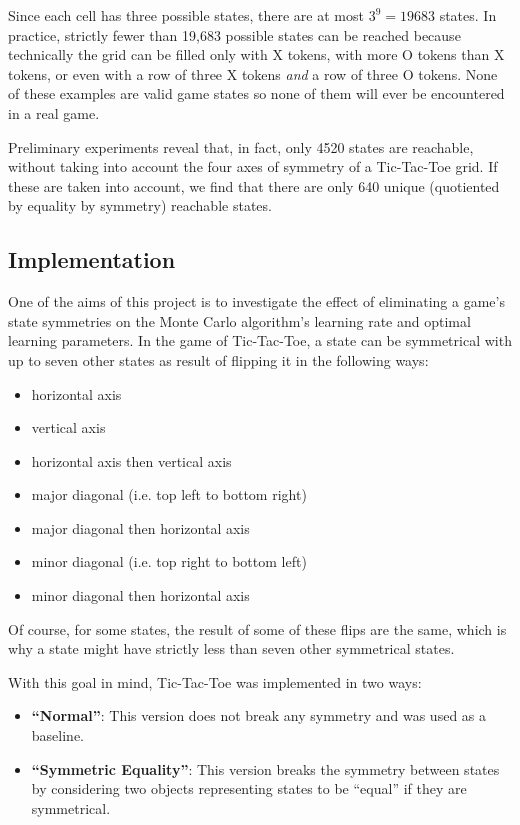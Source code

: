 \documentclass[11pt,a4paper]{report}
\begin{document}
Since each cell has three possible states, there are at most $3^9 = 19683$ states. In practice, strictly fewer than 19,683 possible states can be reached because technically the grid can be filled only with X tokens, with more O tokens than X tokens, or even with a row of three X tokens \emph{and} a row of three O tokens. None of these examples are valid game states so none of them will ever be encountered in a real game.

Preliminary experiments reveal that, in fact, only 4520 states are reachable, without taking into account the four axes of symmetry of a Tic-Tac-Toe grid. If these are taken into account, we find that there are only 640 unique (quotiented by equality by symmetry) reachable states.


\subsection{Implementation}
\label{sec:TicTacToeImplementation}

One of the aims of this project is to investigate the effect of eliminating a game's state symmetries on the Monte Carlo algorithm's learning rate and optimal learning parameters. In the game of Tic-Tac-Toe, a state can be symmetrical with up to seven other states as result of flipping it in the following ways:

\begin{itemize}
	\item horizontal axis
	\item vertical axis
	\item horizontal axis then vertical axis
	\item major diagonal (i.e. top left to bottom right)
	\item major diagonal then horizontal axis
	\item minor diagonal (i.e. top right to bottom left)
	\item minor diagonal then horizontal axis
\end{itemize}

Of course, for some states, the result of some of these flips are the same, which is why a state might have strictly less than seven other symmetrical states.

With this goal in mind, Tic-Tac-Toe was implemented in two ways:

\begin{itemize}

	\item \textbf{``Normal''}:
This version does not break any symmetry and was used as a baseline.

	\item \textbf{``Symmetric Equality''}: 
This version breaks the symmetry between states by considering two objects representing states to be ``equal'' if they are symmetrical.

\end{itemize}
\end{document}
